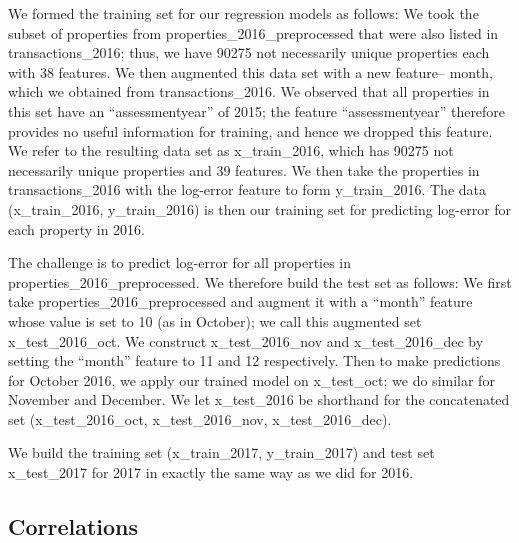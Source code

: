 \documentclass[12pt]{article}
\begin{document}
We formed the training set for our regression models as follows: We took the subset of properties from properties\_2016\_preprocessed that were also listed in transactions\_2016; thus, we have 90275 not necessarily unique properties each with 38 features. We then augmented this data set with a new feature-- month, which we obtained from transactions\_2016. We observed that all properties in this set have an ``assessmentyear'' of 2015; the feature ``assessmentyear'' therefore provides no useful information for training, and hence we dropped this feature. We refer to the resulting data set as x\_train\_2016, which has 90275 not necessarily unique properties and 39 features. We then take the properties in transactions\_2016 with the log-error feature to form y\_train\_2016. The data (x\_train\_2016, y\_train\_2016) is then our training set for predicting log-error for each property in 2016.

The challenge is to predict log-error for all properties in properties\_2016\_preprocessed. We therefore build the test set as follows: We first take properties\_2016\_preprocessed and augment it with a ``month'' feature whose value is set to 10 (as in October); we call this augmented set x\_test\_2016\_oct. We construct x\_test\_2016\_nov and x\_test\_2016\_dec by setting the ``month'' feature to 11 and 12 respectively. Then to make predictions for October 2016, we apply our trained model on x\_test\_oct; we do similar for November and December. We let x\_test\_2016 be shorthand for the concatenated set (x\_test\_2016\_oct, x\_test\_2016\_nov, x\_test\_2016\_dec).

We build the training set (x\_train\_2017, y\_train\_2017) and test set x\_test\_2017 for 2017 in exactly the same way as we did for 2016.

\subsection{Correlations}
\end{document}
